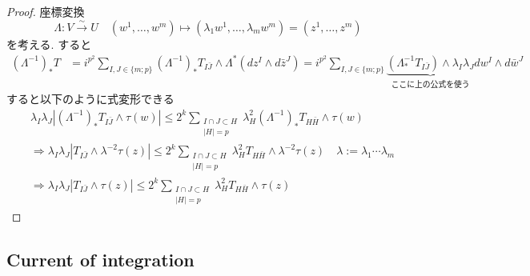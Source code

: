 \begin{proof}
座標変換
$$
\Lambda:V\overset{\sim}{\to} U
\quad
(w^1,\ldots,w^m)\longmapsto (\lambda_1w^1,\ldots,\lambda_mw^m)
=(z^1, \ldots, z^m)
$$を考える. 
すると
\begin{align*}
(\Lambda^{-1})_*T
&= i^{p^2}\sum_{I,J\in \{ m; p\}}
(\Lambda^{-1})_*T_{I\bar J}\wedge \Lambda^*(dz^I\wedge d\bar z^J) 
= i^{p^2}\sum_{I,J\in \{ m; p\}}
\underbrace{
(\Lambda^{-1}_*T_{I\bar J})
\wedge \lambda_I\lambda_J}_{\text{ここに上の公式を使う}}
dw^I\wedge d\bar w^J
\end{align*}
すると以下のように式変形できる
\begin{align*}
&\lambda_I\lambda_J\left|(\Lambda^{-1})_*T_{I\bar J}\wedge \tau(w)\right|
\leq
2^k\sum_{\substack{I\cap J\subset H\\ |H|=p}}\lambda_H^2(\Lambda^{-1})_*T_{H\bar H}\wedge \tau(w)
\\
&\Rightarrow
\lambda_I\lambda_J\left|T_{I\bar J}\wedge \lambda^{-2}\tau(z)\right|
\leq
2^k\sum_{\substack{I\cap J\subset H\\ |H|=p}}\lambda_H^2T_{H\bar H}\wedge \lambda^{-2}\tau(z)
\quad
\lambda:=\lambda_1\cdots\lambda_m
\\
&\Rightarrow
\lambda_I\lambda_J\left|T_{I\bar J}\wedge \tau(z)\right|
\leq
2^k\sum_{\substack{I\cap J\subset H\\ |H|=p}}\lambda_H^2T_{H\bar H}\wedge \tau(z)
\end{align*}
\end{proof}

\subsection{Current of integration}

